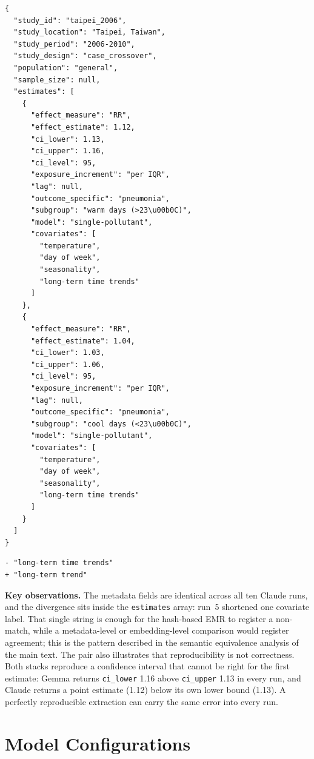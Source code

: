\documentclass[11pt]{article}
\begin{document}
\begin{lstlisting}[language={},caption={Claude Sonnet 4.5 extraction output for ABS-0079, runs 1--4 and 6--10}]
{
  "study_id": "taipei_2006",
  "study_location": "Taipei, Taiwan",
  "study_period": "2006-2010",
  "study_design": "case_crossover",
  "population": "general",
  "sample_size": null,
  "estimates": [
    {
      "effect_measure": "RR",
      "effect_estimate": 1.12,
      "ci_lower": 1.13,
      "ci_upper": 1.16,
      "ci_level": 95,
      "exposure_increment": "per IQR",
      "lag": null,
      "outcome_specific": "pneumonia",
      "subgroup": "warm days (>23\u00b0C)",
      "model": "single-pollutant",
      "covariates": [
        "temperature",
        "day of week",
        "seasonality",
        "long-term time trends"
      ]
    },
    {
      "effect_measure": "RR",
      "effect_estimate": 1.04,
      "ci_lower": 1.03,
      "ci_upper": 1.06,
      "ci_level": 95,
      "exposure_increment": "per IQR",
      "lag": null,
      "outcome_specific": "pneumonia",
      "subgroup": "cool days (<23\u00b0C)",
      "model": "single-pollutant",
      "covariates": [
        "temperature",
        "day of week",
        "seasonality",
        "long-term time trends"
      ]
    }
  ]
}
\end{lstlisting}

\begin{lstlisting}[language={},caption={The only difference in run 5, in both elements of \texttt{estimates}}]
- "long-term time trends"
+ "long-term trend"
\end{lstlisting}

\noindent \textbf{Key observations.} The metadata fields are identical across all ten Claude runs, and the divergence sits inside the \texttt{estimates} array: run~5 shortened one covariate label. That single string is enough for the hash-based EMR to register a non-match, while a metadata-level or embedding-level comparison would register agreement; this is the pattern described in the semantic equivalence analysis of the main text.
The pair also illustrates that reproducibility is not correctness. Both stacks reproduce a confidence interval that cannot be right for the first estimate: Gemma returns \texttt{ci\_lower} 1.16 above \texttt{ci\_upper} 1.13 in every run, and Claude returns a point estimate (1.12) below its own lower bound (1.13). A perfectly reproducible extraction can carry the same error into every run.

\section{Model Configurations}
\label{sec:configs}
\end{document}

